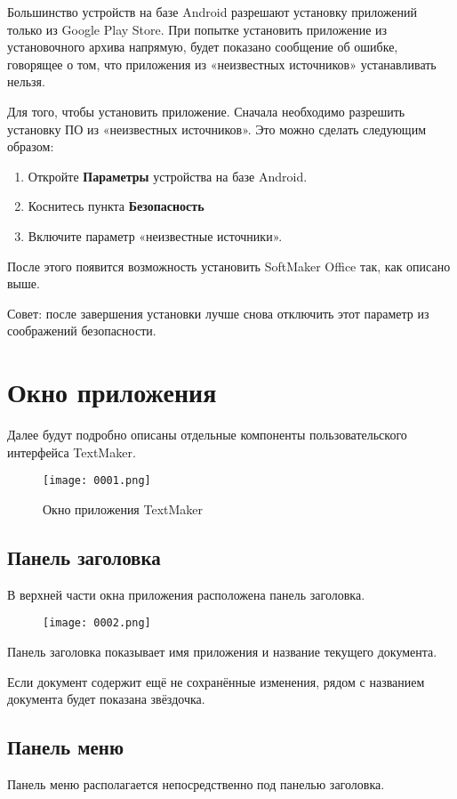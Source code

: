 \documentclass[a4paper,10pt]{article}
\begin{document}
Большинство устройств на базе Android разрешают установку приложений только из Google Play Store. При попытке установить приложение из установочного архива напрямую, будет показано сообщение об ошибке, говорящее о том, что приложения из «неизвестных источников» устанавливать нельзя.

Для того, чтобы установить приложение. Сначала необходимо разрешить установку ПО из «неизвестных источников». Это можно сделать следующим образом:
\begin{enumerate}
 \item Откройте \textbf{Параметры} устройства на базе Android.
 \item Коснитесь пункта \textbf{Безопасность}
 \item Включите параметр «неизвестные источники».
\end{enumerate}
После этого появится возможность установить SoftMaker Office так, как описано выше.

Совет: после завершения установки лучше снова отключить этот параметр из соображений безопасности.

\section{Окно приложения}
Далее будут подробно описаны отдельные компоненты пользовательского интерфейса TextMaker.

\begin{figure}[ht]
\texttt{[image: 0001.png]}
\centering
\caption{Окно приложения TextMaker}
\end{figure}

\subsection{Панель заголовка}
В верхней части окна приложения расположена панель заголовка.

\begin{figure}[ht]
\texttt{[image: 0002.png]}
\centering
\end{figure}
Панель заголовка показывает имя приложения и название текущего документа.

Если документ содержит ещё не сохранённые изменения, рядом с названием документа будет показана звёздочка.
\subsection{Панель меню}
Панель меню располагается непосредственно под панелью заголовка.
\end{document}
